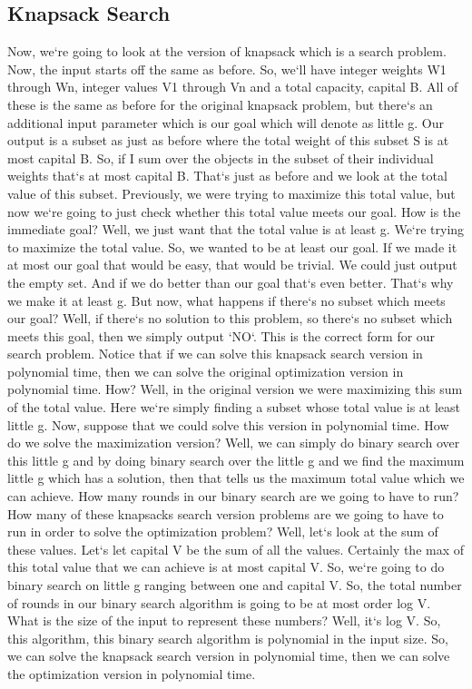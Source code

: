 \subsection{Knapsack  Search}
Now, we`re going to look at the version of knapsack which is a search problem.
Now, the input starts off the same as before.
So, we`ll have integer weights W1 through Wn, integer values V1 through Vn and a total capacity, capital B\@.
All of these is the same as before for the original knapsack problem, but there`s an additional input parameter which is our goal which will denote as little g.
Our output is a subset as just as before where the total weight of this subset S is at most capital B\@.
So, if I sum over the objects in the subset of their individual weights that`s at most capital B\@.
That`s just as before and we look at the total value of this subset.
Previously, we were trying to maximize this total value, but now we`re going to just check whether this total value meets our goal.
How is the immediate goal? Well, we just want that the total value is at least g.
We`re trying to maximize the total value.
So, we wanted to be at least our goal.
If we made it at most our goal that would be easy, that would be trivial.
We could just output the empty set.
And if we do better than our goal that`s even better.
That`s why we make it at least g.
But now, what happens if there`s no subset which meets our goal? Well, if there`s no solution to this problem, so there`s no subset which meets this goal, then we simply output `NO`.
This is the correct form for our search problem.
Notice that if we can solve this knapsack search version in polynomial time, then we can solve the original optimization version in polynomial time.
How? Well, in the original version we were maximizing this sum of the total value.
Here we`re simply finding a subset whose total value is at least little g.
Now, suppose that we could solve this version in polynomial time.
How do we solve the maximization version? Well, we can simply do binary search over this little g and by doing binary search over the little g and we find the maximum little g which has a solution, then that tells us the maximum total value which we can achieve.
How many rounds in our binary search are we going to have to run? How many of these knapsacks search version problems are we going to have to run in order to solve the optimization problem? Well, let`s look at the sum of these values.
Let`s let capital V be the sum of all the values.
Certainly the max of this total value that we can achieve is at most capital V\@.
So, we`re going to do binary search on little g ranging between one and capital V\@.
So, the total number of rounds in our binary search algorithm is going to be at most order log V\@.
What is the size of the input to represent these numbers? Well, it`s log V\@.
So, this algorithm, this binary search algorithm is polynomial in the input size.
So, we can solve the knapsack search version in polynomial time, then we can solve the optimization version in polynomial time.

